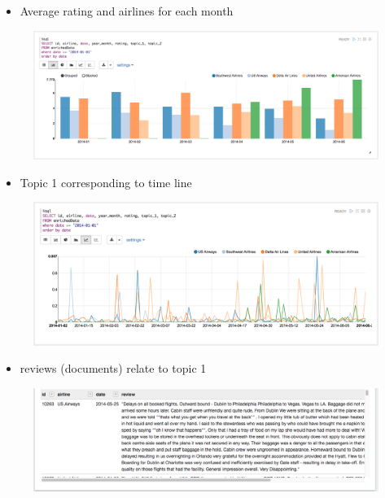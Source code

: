 \documentclass[letterpaper,11pt,english]{sphinxmanual}
\begin{document}
\begin{itemize}
\item {} 
Average rating and airlines for each month

\end{itemize}
\begin{figure}[htbp]
\centering

\includegraphics{avg_rating_mon.png}
\end{figure}
\begin{itemize}
\item {} 
Topic 1 corresponding to time line

\end{itemize}
\begin{figure}[htbp]
\centering

\includegraphics{topic_time.png}
\end{figure}
\begin{itemize}
\item {} 
reviews (documents) relate to topic 1

\end{itemize}
\begin{figure}[htbp]
\centering

\includegraphics{review2topic.png}
\end{figure}
\end{document}
